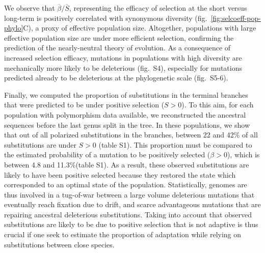 \documentclass{article}
\newcommand{\Sphy}{S}
\newcommand{\SphyMean}{\overline{\Sphy}}
\newcommand{\Spop}{\beta}
\newcommand{\SpopMean}{\overline{\Spop}}
\begin{document}
    We observe that $\SpopMean/\SphyMean$, representing the efficacy of selection at the short versus long-term is positively correlated with synonymous diversity (fig.~\ref{fig:selcoeff-pop-phylo}C), a proxy of effective population size.
    Altogether, populations with large effective population size are under more efficient selection, confirming the prediction of the nearly-neutral theory of evolution.
    As a consequence of increased selection efficacy, mutations in populations with high diversity are mechanically more likely to be deleterious (fig.~S4), especially for mutations predicted already to be deleterious at the phylogenetic scale (fig.~S5-6).

    Finally, we computed the proportion of substitutions in the terminal branches that were predicted to be under positive selection ($\Sphy > 0$).
    To this aim, for each population with polymorphism data available, we reconstructed the ancestral sequences before the last genus split in the tree.
    In these populations, we show that out of all polarized substitutions in the branches, between 22 and 42\% of all substitutions are under $\Sphy > 0$ (table S1).
    This proportion must be compared to the estimated probability of a mutation to be positively selected ($\Spop > 0$), which is between 4.8 and 11.3\%(table S1).
    As a result, these observed substitutions are likely to have been positive selected because they restored the state which corresponded to an optimal state of the population.
    Statistically, genomes are thus involved in a tug-of-war between a large volume deleterious mutations that eventually reach fixation due to drift, and scarce advantageous mutations that are repairing ancestral deleterious substitutions.
    Taking into account that observed substitutions are likely to be due to positive selection that is not adaptive is thus crucial if one seek to estimate the proportion of adaptation while relying on substitutions between close species\cite{mcdonald_adaptative_1991}.
\end{document}
